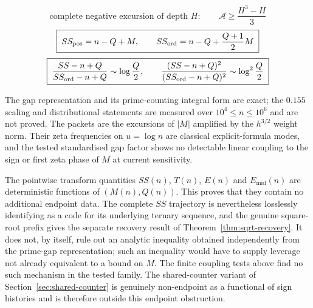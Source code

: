 \documentclass[11pt]{amsart}
\numberwithin{equation}{section}
\theoremstyle{plain}
\theoremstyle{definition}
\theoremstyle{remark}
\begin{document}
\begin{equation}
\label{eq:summary-negative-energy}
\boxed{\;\text{complete negative excursion of depth }H:\qquad
\mathcal A\ge\frac{H^3-H}{3}\;}
\end{equation}
\begin{equation}
\label{eq:summary-nonprime-controls}
\boxed{\;SS_{\rm pos}=n-Q+M,\qquad
SS_{\rm ord}=n-Q+\frac{Q+1}{2}M\;}
\end{equation}
\begin{equation}
\label{eq:summary-prime-amplification}
\boxed{\;\frac{SS-n+Q}{SS_{\rm ord}-n+Q}\sim\log\frac Q2,
\qquad
\frac{(SS-n+Q)^2}{(SS_{\rm ord}-n+Q)^2}\sim\log^2\frac Q2\;}
\end{equation}

The gap representation and its prime-counting integral form are exact; the
$0.155$ scaling and distributional statements are measured over
$10^{4}\le n\le10^{6}$ and are not proved. The packets are the excursions of
$|M|$ amplified by the $h^{3/2}$ weight norm. Their zeta frequencies on
$u=\log n$ are classical explicit-formula modes, and the tested standardised
gap factor shows no detectable linear coupling to the sign or first zeta phase
of $M$ at current sensitivity.

The pointwise transform quantities $SS(n)$, $T(n)$, $E(n)$ and
$E_{\mathrm{mid}}(n)$ are deterministic functions of $(M(n),Q(n))$. This proves
that they contain no additional endpoint data.  The complete $SS$ trajectory is
nevertheless losslessly identifying as a code for its underlying ternary
sequence, and the genuine square-root prefix gives the separate recovery result
of Theorem~\ref{thm:sqrt-recovery}. It does not, by itself, rule out an
analytic inequality obtained independently from the prime-gap representation; such an
inequality would have to supply leverage not already equivalent to a bound on $M$. The
finite coupling tests above find no such mechanism in the tested family. The shared-counter
variant of Section~\ref{sec:shared-counter} is genuinely non-endpoint as a functional
of sign histories and is therefore outside this endpoint obstruction.

\clearpage

\end{document}
